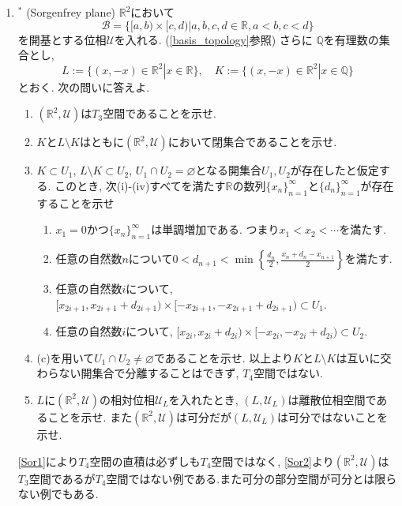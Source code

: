 \documentclass[dvipdfmx,a4paper,11pt]{article}
\newcommand{\R}{\mathbb{R}}
\newcommand{\Q}{\mathbb{Q}}
\theoremstyle{definition}
\begin{document}
\begin{enumerate}[label=\textbf{問}\ref*{sec-countable}.\arabic*]
\item  $^{*}$  \label{Sor2} (Sorgenfrey plane) $\R^2$において
$$
\mathscr{B} = \{[a,b) \times [c,d) | a,b,c,d \in \R, a<b, c<d\} 
$$
を開基とする位相$\mathscr{U}$を入れる. (\ref{basis_topology}参照)
さらに $\Q$を有理数の集合とし, 
$$L := \{ (x, -x )\in \R^2 | x \in \R\}, \quad K := \{ (x, -x )\in \R^2 | x \in \Q\}$$
とおく. 次の問いに答えよ. 
\begin{enumerate}
	\setlength{\parskip}{0cm} 
  \setlength{\itemsep}{0pt} 
\item $(\R^2,\mathscr{U})$は$T_3$空間であることを示せ. 
\item $K$と$L \setminus K$はともに$(\R^2,\mathscr{U})$において閉集合であることを示せ. 
\item $K \subset U_1$, $L \setminus K \subset U_2$, $U_1 \cap U_2 =\varnothing $となる開集合$U_1, U_2$が存在したと仮定する.
このとき, 次(i)-(iv)すべてを満たす$\R$の数列$\{x_n \}_{n=1}^{\infty}$と$\{ d_n\}_{n=1}^{\infty}$が存在することを示せ
\begin{enumerate}[label=(\roman*)]
\item $x_1 =0$かつ$\{x_n \}_{n=1}^{\infty}$は単調増加である. つまり$x_1 < x_2 < \cdots$を満たす.
\item 任意の自然数$n$について$0 < d_{n+1} < \min \left\{ \frac{d_n}{2}, \frac{x_n + d_n - x_{n+1}}{2}\right\}$を満たす.
\item 任意の自然数$i$について, $[x_{2i+1}, x_{2i+1}+ d_{2i+1}) \times [-x_{2i+1}, -x_{2i+1}+ d_{2i+1})\subset U_1$.
\item 任意の自然数$i$について, $[x_{2i}, x_{2i}+ d_{2i}) \times [-x_{2i}, -x_{2i}+ d_{2i})\subset U_2$.
\end{enumerate}
\item (c)を用いて$U_1 \cap U_2  \neq \varnothing $であることを示せ. 以上より$K$と$L \setminus K$は互いに交わらない開集合で分離することはできず, $T_4$空間ではない.
\item $L$に$(\R^2,\mathscr{U})$の相対位相$\mathscr{U}_L$を入れたとき, $(L,\mathscr{U}_L)$は離散位相空間であることを示せ. また$(\R^2,\mathscr{U})$は可分だが$(L,\mathscr{U}_L)$は可分ではないことを示せ.
\end{enumerate}
\ref{Sor1}により$T_4$空間の直積は必ずしも$T_4$空間ではなく, \ref{Sor2}より$(\R^2,\mathscr{U})$は$T_3$空間であるが$T_4$空間ではない例である.また可分の部分空間が可分とは限らない例でもある.
\end{enumerate}
\end{document}
